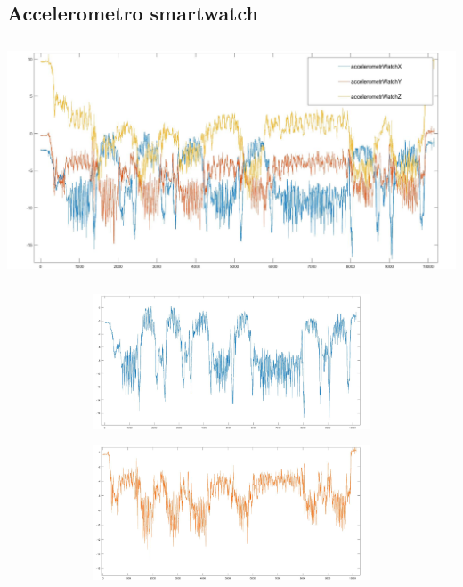 \documentclass[a4paper, oneside]{book}
\begin{document}
\clearpage

\subsection{Accelerometro smartwatch}
\begin{minipage}{\linewidth}
\begin{center}
\includegraphics[width=160mm, height= 70mm]{./images/registrazione_tesi/accelerometrXYZ.jpg} 
\end{center}
\end{minipage}
\makebox[\linewidth]{}
\makebox[\linewidth]{}\makebox[\linewidth]{}\makebox[\linewidth]{}
\makebox[\linewidth]{}\makebox[\linewidth]{}\makebox[\linewidth]{}
\makebox[\linewidth]{}\makebox[\linewidth]{}\makebox[\linewidth]{}

\begin{minipage}{\linewidth}
\begin{center}
\includegraphics[width=154mm, height= 40mm]{./images/registrazione_tesi/accX.jpg} 
\end{center}
\end{minipage}

\begin{minipage}{\linewidth}
\begin{center}
\includegraphics[width=154mm, height= 40mm]{./images/registrazione_tesi/accY.jpg} 
\end{center}
\end{minipage}
\end{document}
